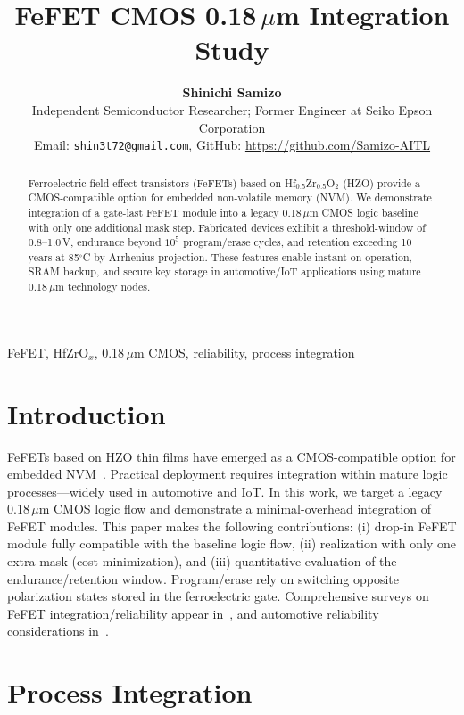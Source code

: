 \documentclass[journal]{IEEEtran}
\title{FeFET CMOS 0.18\,$\mu$m Integration Study}
\author{%
  \textbf{Shinichi Samizo}\\[-1ex]
  \normalsize Independent Semiconductor Researcher; Former Engineer at Seiko Epson Corporation\\
  \normalsize Email: \texttt{shin3t72@gmail.com}, GitHub: \url{https://github.com/Samizo-AITL}
}
\begin{document}
\maketitle

\begin{abstract}
Ferroelectric field-effect transistors (FeFETs) based on Hf$_{0.5}$Zr$_{0.5}$O$_2$ (HZO) provide a CMOS-compatible option for embedded non-volatile memory (NVM). We demonstrate integration of a gate-last FeFET module into a legacy 0.18\,$\mu$m CMOS logic baseline with only one additional mask step. Fabricated devices exhibit a threshold-window of 0.8–1.0\,V, endurance beyond $10^5$ program/erase cycles, and retention exceeding 10 years at 85$^\circ$C by Arrhenius projection. These features enable instant-on operation, SRAM backup, and secure key storage in automotive/IoT applications using mature 0.18\,$\mu$m technology nodes.
\end{abstract}

\begin{IEEEkeywords}
FeFET, HfZrO$_x$, 0.18\,$\mu$m CMOS, reliability, process integration
\end{IEEEkeywords}

\section{Introduction}
FeFETs based on HZO thin films have emerged as a CMOS-compatible option for embedded NVM~\cite{Boscke2011,Mueller2012,Schenk2019}. Practical deployment requires integration within mature logic processes—widely used in automotive and IoT. In this work, we target a legacy 0.18\,$\mu$m CMOS logic flow and demonstrate a minimal-overhead integration of FeFET modules. This paper makes the following contributions: (i) drop-in FeFET module fully compatible with the baseline logic flow, (ii) realization with only one extra mask (cost minimization), and (iii) quantitative evaluation of the endurance/retention window. Program/erase rely on switching opposite polarization states stored in the ferroelectric gate. Comprehensive surveys on FeFET integration/reliability appear in~\cite{Mueller2012,Mueller2015}, and automotive reliability considerations in~\cite{Nakamura2003}.

\section{Process Integration}
\end{document}
